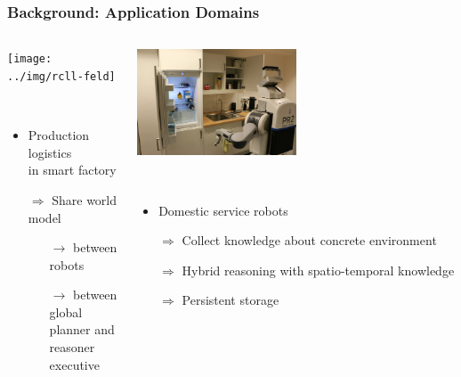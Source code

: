 \begin{frame}
  \frametitle{Background: Application Domains}
  \begin{columns}
    \begin{column}{0.5\textwidth}
    \begin{flushleft}
    \texttt{[image: ../img/rcll-feld]}
    \end{flushleft}
  \begin{description}[]
  \item[RoboCup Logistics League] \hfill \\
    \begin{itemize}
    \item Production logistics\\ in smart factory
    \item[$\Rightarrow$] Share world model
    \begin{itemize}
    \item[$\rightarrow$] between robots
    \item[$\rightarrow$] between global planner and reasoner executive
    \end{itemize}
    \end{itemize}
  \end{description}
    \end{column}
    \begin{column}{0.5\textwidth}
    \begin{flushright}
    \includegraphics[width=0.5\textwidth]{../img/pr2-kbsg-kitchen}
    \end{flushright}
  \begin{description}[]
  \item[RoboCup@Home]<uncover@2-> \hfill \\
    \begin{itemize}
    \item Domestic service robots
    \item[$\Rightarrow$] Collect knowledge about concrete environment
    \item[$\Rightarrow$] Hybrid reasoning with spatio-temporal knowledge
    \item[$\Rightarrow$] Persistent storage
    \end{itemize}
  \end{description}    
    \end{column}
  \end{columns}
  
\end{frame}

